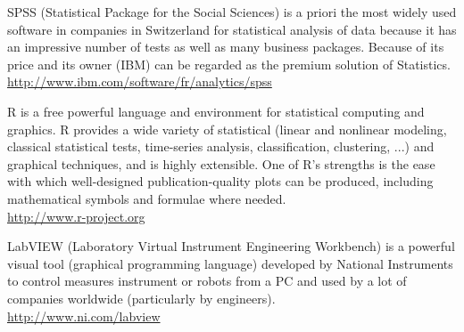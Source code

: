 	{\Large {}}{\Large {}} SPSS (Statistical Package for the Social Sciences) is a priori the most widely used software in companies in Switzerland for statistical analysis of data because it has an impressive number of tests as well as many business packages. Because of its price and its owner (IBM) can be regarded as the premium solution of Statistics.\\
	\href{http://www.ibm.com/software/fr/analytics/spss}{\color{blue}http://www.ibm.com/software/fr/analytics/spss}
	
	{\Large {}}{\Large {}}{\Large {}} R is a free powerful language and environment for statistical computing and graphics. R provides a wide variety of statistical (linear and nonlinear modeling, classical statistical tests, time-series analysis, classification, clustering, ...) and graphical techniques, and is highly extensible. One of R's strengths is the ease with which well-designed publication-quality plots can be produced, including mathematical symbols and formulae where needed.\\
	\href{http://www.r-project.org}{\color{blue}http://www.r-project.org}
	
	{\Large {}}{\Large {}} LabVIEW (Laboratory Virtual Instrument Engineering Workbench) is a powerful visual tool (graphical programming language) developed by National Instruments to control measures instrument or robots from a PC and used by a lot of companies worldwide (particularly by engineers).\\
	\href{http://www.ni.com/labview}{\color{blue}http://www.ni.com/labview}